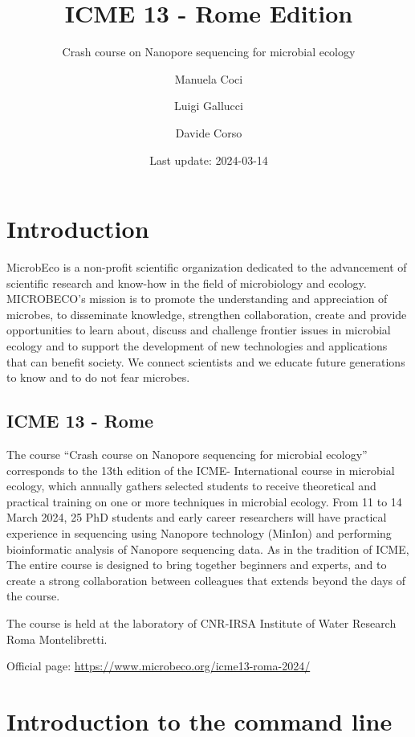\documentclass[
]{book}
\title{ICME 13 - Rome Edition}
\subtitle{Crash course on Nanopore sequencing for microbial ecology}
\author{Manuela Coci \and Luigi Gallucci \and Davide Corso}
\date{Last update: 2024-03-14}
\begin{document}
\maketitle

{
\setcounter{tocdepth}{1}
\tableofcontents
}
\chapter{Introduction}\label{introduction}

MicrobEco is a non-profit scientific organization dedicated to the advancement of scientific research and know-how in the field of microbiology and ecology. MICROBECO's mission is to promote the understanding and appreciation of microbes, to disseminate knowledge, strengthen collaboration, create and provide opportunities to learn about, discuss and challenge frontier issues in microbial ecology and to support the development of new technologies and applications that can benefit society. We connect scientists and we educate future generations to know and to do not fear microbes.

\section{ICME 13 - Rome}\label{icme-13---rome}

The course ``Crash course on Nanopore sequencing for microbial ecology'' corresponds to the 13th edition of the ICME- International course in microbial ecology, which annually gathers selected students to receive theoretical and practical training on one or more techniques in microbial ecology. From 11 to 14 March 2024, 25 PhD students and early career researchers will have practical experience in sequencing using Nanopore technology (MinIon) and performing bioinformatic analysis of Nanopore sequencing data. As in the tradition of ICME, The entire course is designed to bring together beginners and experts, and to create a strong collaboration between colleagues that extends beyond the days of the course.

The course is held at the laboratory of CNR-IRSA Institute of Water Research Roma Montelibretti.

Official page: \url{https://www.microbeco.org/icme13-roma-2024/}

\chapter{Introduction to the command line}\label{introduction-to-the-command-line}
\end{document}
